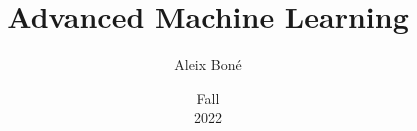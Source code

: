 




\usepackage{emptypage}


\renewcommand\and{\\[\baselineskip]}

\title{Advanced Machine Learning}
\author{Aleix Boné}
\date{Fall \\ 2022}

\makeindex


\newcommand{\iemph}[1]{\index{#1}\emph{#1}}

\frontmatter

\cleardoublepage

\cleardoublepage



\tableofcontents \pagebreak



